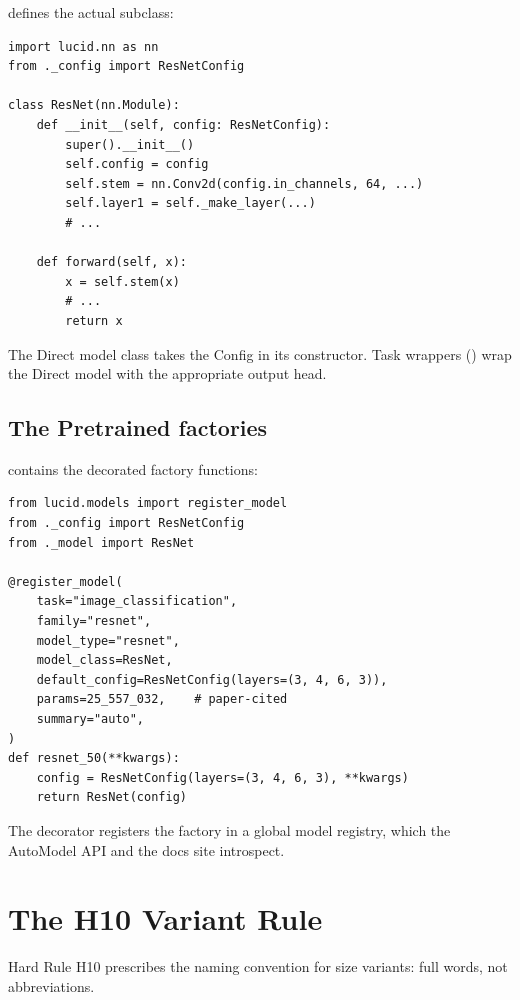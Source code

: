  defines the actual  subclass:

\begin{lstlisting}[style=lucid,language=LucidPython]
import lucid.nn as nn
from ._config import ResNetConfig

class ResNet(nn.Module):
    def __init__(self, config: ResNetConfig):
        super().__init__()
        self.config = config
        self.stem = nn.Conv2d(config.in_channels, 64, ...)
        self.layer1 = self._make_layer(...)
        # ...

    def forward(self, x):
        x = self.stem(x)
        # ...
        return x
\end{lstlisting}

The Direct model class takes the Config in its constructor. Task
wrappers () wrap the Direct
model with the appropriate output head.

\subsection{The Pretrained factories}
\label{ssec:zoo_architecture:pretrained_factories}

 contains the 
decorated factory functions:

\begin{lstlisting}[style=lucid,language=LucidPython]
from lucid.models import register_model
from ._config import ResNetConfig
from ._model import ResNet

@register_model(
    task="image_classification",
    family="resnet",
    model_type="resnet",
    model_class=ResNet,
    default_config=ResNetConfig(layers=(3, 4, 6, 3)),
    params=25_557_032,    # paper-cited
    summary="auto",
)
def resnet_50(**kwargs):
    config = ResNetConfig(layers=(3, 4, 6, 3), **kwargs)
    return ResNet(config)
\end{lstlisting}

The decorator registers the factory in a global model registry,
which the AutoModel API and the docs site introspect.

\section{The H10 Variant Rule}
\label{sec:zoo_architecture:h10_variant_rule}

Hard Rule H10 prescribes the naming convention for size
variants: full words, not abbreviations.

